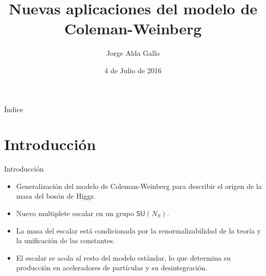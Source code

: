 \documentclass{beamer}
\author{Jorge Alda Gallo}
\title{Nuevas aplicaciones del modelo de Coleman-Weinberg}
\institute{Departamento de Física Teórica I, Universidad Complutense de Madrid}
\date{4 de Julio de 2016}
\begin{document}
\begin{frame}[t, plain]
\titlepage
\end{frame}

\begin{frame}[t]{Índice}
\tableofcontents
\end{frame}

\section{Introducción}
\begin{frame}{Introducción}
\begin{itemize}
\item Generalización del modelo de Coleman-Weinberg para describir el origen de la masa del bosón de Higgs.
\item Nuevo multiplete escalar en un grupo $\mathsf{SU}(N_S)$.
\item La masa del escalar está condicionada por la renormalizabilidad de la teoría y la unificación de las constantes. 
\item El escalar se acola al resto del modelo estándar, lo que determina su producción en aceleradores de partículas y su desintegración.
\end{itemize}
\end{frame}
\end{document}
